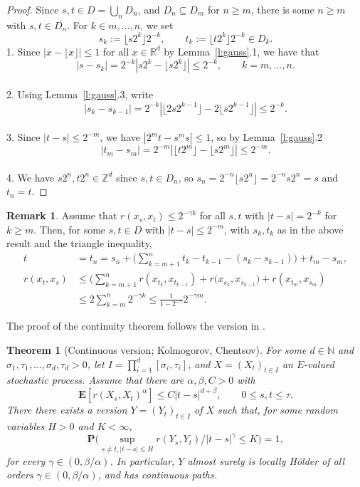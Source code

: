 \documentclass{article}
\newtheorem{theorem}{Theorem}
\theoremstyle{definition}
\newtheorem{remark}[proposition]{Remark}
\theoremstyle{step} \newtheorem{step}{Step}
\begin{document}
\begin{proof}
  Since $s,t \in D = \bigcup_n D_n$, and $D_n \subseteq D_m$ for
  $n\geq m$, there is some $n \geq m$ with $s,t\in D_n$. For $k \in
    m,...,n$, we set
  $$s_k := \lfloor s2^k\rfloor 2^{-k}, \qquad t_k := \lfloor
    t2^k\rfloor 2^{-k} \in D_k.$$ 1.  Since $|x - \lfloor x \rfloor |
    \leq 1$ for all $x \in \mathbb R^d$ by Lemma~\ref{l:gauss}.1, we have that
  $$|s - s_k| = 2^{-k}|s2^k - \lfloor s2^k\rfloor| \leq 2^{-k}, \qquad
    k=m,...,n.$$ \\ 2. Using Lemma~\ref{l:gauss}.3, write
  $$ |s_k - s_{k-1}| = 2^{-k} | \lfloor 2s2^{k-1}\rfloor - 2\lfloor
    s2^{k-1}\rfloor| \leq 2^{-k}.$$ \\ 3. Since  $|t-s| \leq
    2^{-m}$, we have $|2^mt - s^ms| \leq 1$, so by Lemma~\ref{l:gauss}.2
  $$ |t_m - s_m| = 2^{-m} | \lfloor t2^m\rfloor - \lfloor s2^m
    \rfloor| \leq 2^{-m}.$$ \\ 4. We have $s2^n, t2^n \in \mathbb Z^d$
  since $s,t \in D_n$, so $s_n = 2^{-n} \lfloor s2^n\rfloor = 2^{-n} s
    2^n = s$ and $t_n = t$.
\end{proof}

\begin{remark}\label{rem1}
  Assume that $r(x_s, x_t) \leq 2^{-\gamma k}$ for all $s,t$ with
  $|t-s| = 2^{-k}$ for $k\geq m$. Then, for some $s,t\in D$ with
  $|t-s| \leq 2^{-m}$, with $s_k, t_k$ as in the above result and the
  triangle inequality,
  \begin{align*}
    t & = t_n = s_n + \Big(\sum_{k=m+1}^n t_k - t_{k-1} -(s_k -
    s_{k-1})\Big) + t_m - s_m,                                  \\ r(x_t, x_s) & \leq
    \Big(\sum_{k=m+1}^n r(x_{t_k}, x_{t_{k-1}}) + r(x_{s_k},
    x_{s_{k-1}}\Big) + r(x_{t_m}, x_{s_m})                      \\ & \leq 2 \sum_{k=m}^n
    2^{-\gamma k} \leq \tfrac{1}{1-2^{-\gamma}} 2^{-\gamma m}.
  \end{align*}
\end{remark}

\noindent
The proof of the continuity theorem follows the version in
\cite{karatzas1991brownian}.

\begin{theorem}[Continuous version; Kolmogorov, Chentsov]
  \label{T:kolchen}
  For some $d\in\mathbb N$ and
  $\sigma_1,\tau_1,...,\sigma_d,\tau_d>0$, let $I = \prod_{i=1}^d
    [\sigma_i,\tau_i]$, and $X = (X_t)_{t\in I}$ an $E$-valued
  stochastic process. Assume that there are $\alpha, \beta, C>0$ with
  $$ \mathbf E[r(X_s, X_t)^\alpha] \leq C|t-s|^{d+\beta}, \qquad 0\leq
    s,t\leq \tau.$$ There there exists a version $Y = (Y_t)_{t\in I}$ of
  $X$ such that, for some random variables $H>0$ and $K<\infty$,
  $$ \mathbf P\Big(\sup_{s\neq t, |t-s| \leq H} r(Y_s,
    Y_t)/|t-s|^\gamma \leq K\Big) = 1,
  $$ for every $\gamma\in(0,\beta/\alpha)$. In particular, $Y$ almost
  surely is locally Hölder of all orders $\gamma\in(0,\beta/\alpha)$,
  and has continuous paths.
\end{theorem}
\end{document}
